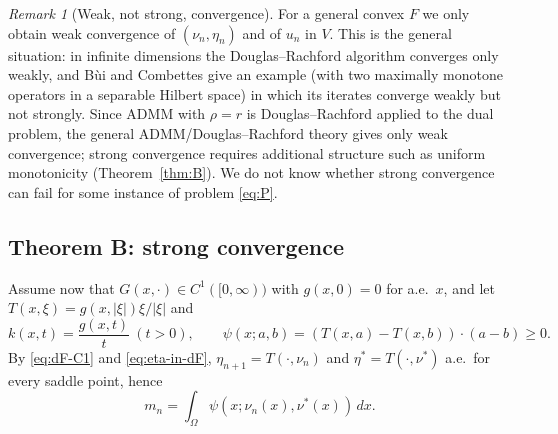 \documentclass[11pt]{amsart}
\theoremstyle{definition}
\theoremstyle{remark}
\newtheorem{remark}[theorem]{Remark}
\numberwithin{equation}{section}
\newcommand{\dx}{\,dx}
\newcommand{\abs}[1]{\lvert #1\rvert}
\begin{document}
\begin{remark}[Weak, not strong, convergence]\label{rem:weak-only}
For a general convex $F$ we only obtain weak convergence of $(\nu_n,\eta_n)$ and of $u_n$ in $V$. This is the general situation: in infinite dimensions the Douglas--Rachford algorithm converges only weakly, and B\`ui and Combettes \cite{BuiCombettes2020} give an example (with two maximally monotone operators in a separable Hilbert space) in which its iterates converge weakly but not strongly. Since ADMM with $\rho=r$ is Douglas--Rachford applied to the dual problem, the general ADMM/Douglas--Rachford theory gives only weak convergence; strong convergence requires additional structure such as uniform monotonicity (Theorem~\ref{thm:B}). We do not know whether strong convergence can fail for some instance of problem \eqref{eq:P}.
\end{remark}

\subsection{Theorem B: strong convergence}\label{ssec:thmB}
Assume now that $G(x,\cdot)\in C^1([0,\infty))$ with $g(x,0)=0$ for a.e.\ $x$, and let $T(x,\xi)=g(x,\abs\xi)\xi/\abs\xi$ and
\[
k(x,t)=\frac{g(x,t)}t\ (t>0),\qquad \psi(x;a,b)=(T(x,a)-T(x,b))\cdot(a-b)\ge0 .
\]
By \eqref{eq:dF-C1} and \eqref{eq:eta-in-dF}, $\eta_{n+1}=T(\cdot,\nu_n)$ and $\eta^*=T(\cdot,\nu^*)$ a.e.\ for every saddle point, hence
\begin{equation}\label{eq:mn-psi}
m_n=\int_\Omega\psi(x;\nu_n(x),\nu^*(x))\dx .
\end{equation}
\end{document}
